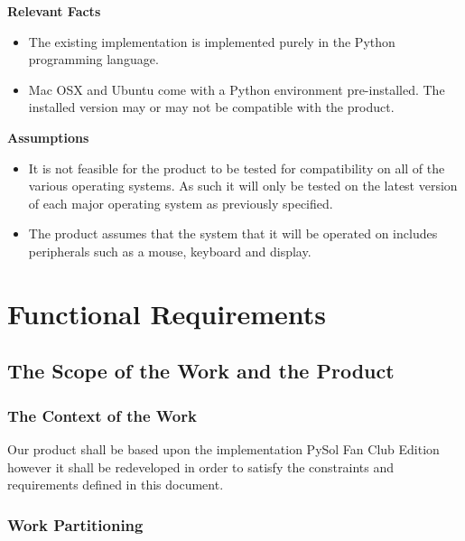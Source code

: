 \documentclass[12pt, titlepage]{article}
\begin{document}
		\textbf{Relevant Facts}
		\vspace{-2mm}
		\begin{itemize}
			\itemsep0em
			\item The existing implementation is implemented purely in 
			the Python programming language.
			\item Mac OSX and Ubuntu come with a Python environment 
			pre-installed. The installed version may or may not be compatible 
			with 
			the product.
		\end{itemize}
		\textbf{Assumptions}
		\vspace{-2mm}
		\begin{itemize}
			\itemsep0em
			\item 	It is not feasible for the product to be tested for 
			compatibility on all of the various operating systems. As such it 
			will only be tested on the latest version of each major operating 
			system as previously specified.
			\item The product assumes that the system that it will be operated 
			on includes peripherals such as a mouse, keyboard and display.
		\end{itemize}
		
	\section{Functional Requirements}
		\subsection{The Scope of the Work and the Product}
		\subsubsection{The Context of the Work}
		\indent Our product shall be based upon the implementation PySol Fan Club
		Edition however it shall be redeveloped in order to satisfy the constraints
		and requirements defined in this document.\\
		\subsubsection{Work Partitioning}
\end{document}
